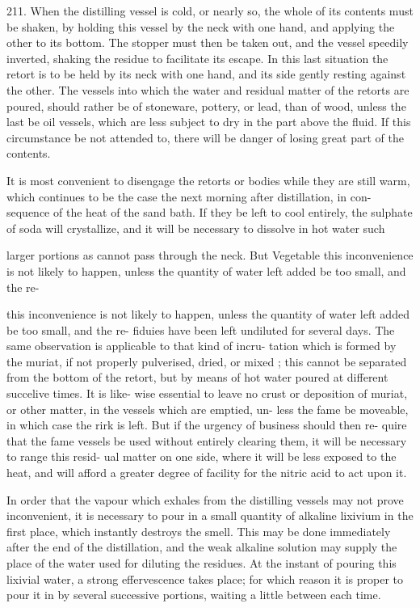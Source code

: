 \documentclass{article}
\begin{document}
211. When the distilling vessel is cold, or nearly so, the whole of its contents must be shaken, by holding this vessel by the neck with one hand, and applying the other to its bottom. The stopper must then be taken out, and the vessel speedily inverted, shaking the residue to facilitate its escape. In this last situation the retort is to be held by its neck with one hand, and its side gently resting against the other. The vessels into which the water and residual matter of the retorts are poured, should rather be of stoneware, pottery, or lead, than of wood, unless the last be oil vessels, which are less subject to dry in the part above the fluid. If this circumstance be not attended to, there will be danger of losing great part of the contents.

It is most convenient to disengage the retorts or
bodies while they are still warm, which continues to
be the case the next morning after distillation, in con-
sequence of the heat of the sand bath. If they be left
to cool entirely, the sulphate of soda will crystallize,
and it will be necessary to dissolve in hot water such

larger portions as cannot pass through the neck. But Vegetable
this inconvenience is not likely to happen, unless the
quantity of water left added be too small, and the re-

this inconvenience is not likely to happen, unless the
quantity of water left added be too small, and the re-
fiduies have been left undiluted for several days. The
same observation is applicable to that kind of incru-
tation which is formed by the muriat, if not properly
pulverised, dried, or mixed ; this cannot be separated
from the bottom of the retort, but by means of hot
water poured at different succelive times. It is like-
wise essential to leave no crust or deposition of muriat,
or other matter, in the vessels which are emptied, un-
less the fame be moveable, in which case the rirk is
left. But if the urgency of business should then re-
quire that the fame vessels be used without entirely
clearing them, it will be necessary to range this resid-
ual matter on one side, where it will be less exposed
to the heat, and will afford a greater degree of facility
for the nitric acid to act upon it.

In order that the vapour which exhales from the distilling vessels may not prove inconvenient, it is necessary to pour in a small quantity of alkaline lixivium in the first place, which instantly destroys the smell. This may be done immediately after the end of the distillation, and the weak alkaline solution may supply the place of the water used for diluting the residues. At the instant of pouring this lixivial water, a strong effervescence takes place; for which reason it is proper to pour it in by several successive portions, waiting a little between each time.
\end{document}
